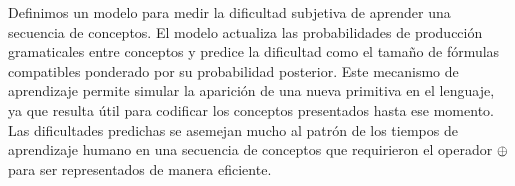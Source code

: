 Definimos un modelo para medir la dificultad subjetiva de aprender una secuencia de conceptos. El modelo actualiza las probabilidades de producción gramaticales entre conceptos y predice la dificultad como el tamaño de fórmulas compatibles ponderado por su probabilidad posterior. Este mecanismo de aprendizaje permite simular la aparición de una nueva primitiva en el lenguaje, ya que resulta útil para codificar los conceptos presentados hasta ese momento. Las dificultades predichas se asemejan mucho al patrón de los tiempos de aprendizaje humano en una secuencia de conceptos que requirieron el operador $ \oplus $ para ser representados de manera eficiente.